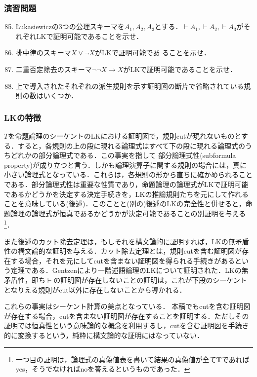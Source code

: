 \documentclass{ltjsarticle}
\theoremstyle{mystyle1}
\theoremstyle{mystyle3}
\theoremstyle{mystyle2}
\newcommand{\bT}{\ensuremath{\mathbf{T}}}
\newcommand{\red}[1]{{\color{red} #1}}
\begin{document}
\subsubsection*{演習問題}
\begin{enumerate}
  \setcounter{enumi}{84}
  \item \L ukasiewiczの3つの公理スキーマを$A_1, A_2, A_3$とする．$\vdash A_1,\vdash A_2,\vdash A_3$がそれぞれLKで証明可能であることを示せ．
  \item 排中律のスキーマ$X\vee\neg X$がLKで証明可能であ
  ることを示せ．
  \item 二重否定除去のスキーマ$\neg\neg X\to X$がLKで証明可能であることを示せ．
  \item 上で導入されたそれぞれの派生規則を示す証明図の断片で省略されている規則の数はいくつか．
\end{enumerate}
\subsubsection{LKの特徴}
$T$を命題論理のシーケントのLKにおける証明図で，規則cutが現れないものとする．すると，各規則の上の段に現れる論理式はすべて下の段に現れる論理式のうちどれかの部分論理式である．この事実を指して\red{部分論理式性}(subformula property)が成り立つと言う．しかも論理演算子に関する規則の場合には，真に小さい論理式となっている．これらは，各規則の形から直ちに確かめられることである．部分論理式性は重要な性質であり，命題論理の論理式がLKで証明可能であるかどうかを決定する決定手続きを，LKの推論規則たちを元にして作れることを意味している(後述)．このことと(別の)後述のLKの完全性と併せると，命題論理の論理式が恒真であるかどうかが決定可能であることの別証明を与える\footnote{一つ目の証明は，論理式の真偽値表を書いて結果の真偽値が全て$\bT$であればyes，そうでなければnoを答えるというものであった．}．

また後述のカット除去定理は，もしそれを構文論的に証明すれば，LKの無矛盾性の構文論的な証明を与える．カット除去定理とは，規則cutを含む証明図が存在する場合，それを元にしてcutを含まない証明図を得られる手続きがあるという定理である．Gentzenにより一階述語論理のLKについて証明された．LKの無矛盾性，即ち$\vdash$の証明図が存在しないことの証明は，これが下段のシーケントとなりえる規則がcut以外に存在しないことから導かれる．

これらの事実はシーケント計算の美点となっている． 本稿でもcutを含む証明図が存在する場合，cutを含まない証明図が存在することを証明する．ただしその証明では恒真性という意味論的な概念を利用するし，cutを含む証明図を手続き的に変換するという，純粋に構文論的な証明にはなっていない．
\end{document}
